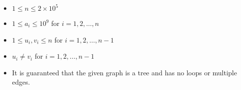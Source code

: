 \begin{itemize}
    \tightlist
    \item $1 \leq n \leq 2 \times 10 ^ 5$
    \item $1 \leq a_i \leq 10 ^ 9$ for $i = 1, 2, \ldots, n$
    \item $1 \leq u_i, v_i \leq n$ for $i = 1, 2, \ldots, n - 1$
    \item $u_i \neq v_i$ for $i = 1, 2, \ldots, n - 1$
    \item It is guaranteed that the given graph is a tree and has no loops or multiple edges.
\end{itemize}
    